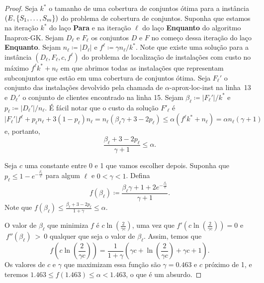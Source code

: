 \begin{proof}
Seja $k^*$ o tamanho de uma cobertura de conjuntos ótima para a instância $(E,\{S_1,\ldots,S_m\})$ do problema de cobertura de conjuntos. Suponha que estamos na iteração $k^*$ do laço {\bf Para} e na iteração $\ell$ do laço {\bf Enquanto} do algoritmo {\sc Inaprox-GK}.
Sejam $D_\ell$ e $F_\ell$ os conjuntos $D$ e $F$ no começo dessa iteração do laço {\bf Enquanto}. Sejam $n_\ell \coloneqq |D_\ell|$ e $f^\ell \coloneqq \gamma n_\ell /k^*$. Note que existe uma solução para a instância $(D_\ell,F_\ell,c,f^\ell)$ do problema de localização de instalações com custo no máximo $f^\ell k^* + n_\ell$ em que abrimos todas as instalações que representam subconjuntos que estão em uma cobertura de conjuntos ótima.
Seja $F_\ell'$ o conjunto das instalações devolvido pela chamada de {\sc $\alpha$-aprox-loc-inst} na linha~13 e $D_\ell'$ o conjunto de clientes encontrado na linha 15. Sejam $\beta_\ell \coloneqq |F_\ell'|/k^*$ e $p_\ell \coloneqq |D_\ell'|/n_\ell $. É fácil notar que o custo da solução $F'_\ell$ é
\[ |F_\ell'| f^\ell+ p_\ell n_\ell + 3 (1-p_\ell) n_\ell = n_\ell(\beta_\ell \gamma + 3 - 2p_\ell) \leq \alpha ( f^\ell k^* + n_\ell) = \alpha n_\ell (\gamma + 1)\]
e, portanto, 
\begin{equation} 
    \label{inaprox:beta}
\frac{\beta_\ell + 3 - 2p_\ell}{\gamma + 1} \leq \alpha.
\end{equation}

Seja $c$ uma constante entre 0 e 1 que vamos escolher depois. Suponha que $p_\ell \leq 1 - e^{-\frac{\beta_\ell}{c}}$ para algum $\ell$ e $0 < \gamma < 1$. Defina 
\[f(\beta_\ell) \coloneqq \frac{\beta_\ell \gamma + 1 + 2e^{-\frac{\beta_\ell}{c}}}{\gamma + 1}.\]
Note que $f(\beta_\ell) \leq \frac{\beta_\ell + 3 - 2p_\ell}{1 + \gamma} \leq \alpha$.

O valor de $\beta_\ell$ que minimiza $f$ é $c\ln(\frac{2}{\gamma c})$, uma vez que $f'(c\ln(\frac{2}{\gamma c})) = 0$ e $~f''(\beta_\ell)~>~0$ qualquer que seja o valor de $\beta_\ell$. Assim, temos que 
\[f(c\ln\left(\frac{2}{\gamma c}\right)) = \frac{1}{1+\gamma} \left( \gamma c + \ln\left(\frac{2}{\gamma c}\right) + \gamma c + 1 \right).\]
Os valores de $c$ e $\gamma$ que maximizam essa função são $\gamma = 0.463$ e $c$ próximo de 1, e teremos $1.463 \leq f(1.463) \leq \alpha < 1.463$, o que é um absurdo.


\end{proof}
